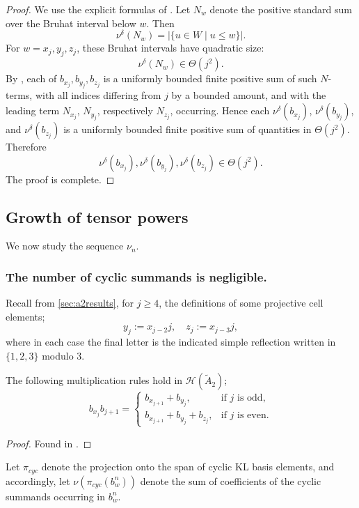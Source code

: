 \documentclass[a4paper,11pt]{amsart}
\newcommand{\Hecke}{\mc H}
\newcommand{\mc}{\mathcal}
\numberwithin{equation}{subsection}
\theoremstyle{definition}
\theoremstyle{remark}
\begin{document}
\begin{proof}
We use the explicit formulas of 
\cite[Lemma~1.4 and Proposition~1.6]{LiPa}. Let \(N_w\) denote the positive
standard sum over the Bruhat interval below \(w\). Then
\[
\nu^\delta(N_w)=|\{u\in W\mid u\leq w\}|.
\]
For \(w=x_j,y_j,z_j\), these Bruhat intervals have quadratic size:
\[
\nu^\delta(N_w)\in\Theta(j^2).
\]
By \cite[Proposition~1.6]{LiPa}, each of
$b_{x_j},b_{y_j},b_{z_j}$
is a uniformly bounded finite positive sum of such \(N\)-terms, with all indices differing from
\(j\) by a bounded amount, and with the leading term \(N_{x_j}\), \(N_{y_j}\),
respectively \(N_{z_j}\), occurring. Hence each
\(\nu^\delta(b_{x_j})\), \(\nu^\delta(b_{y_j})\), and
\(\nu^\delta(b_{z_j})\) is a uniformly bounded finite positive sum of quantities in
\(\Theta(j^2)\). Therefore
\[
\nu^\delta(b_{x_j}), \nu^\delta(b_{y_j}), \nu^\delta(b_{z_j}) \in\Theta(j^2).
\]
The proof is complete.
\end{proof}

\subsection{Growth of tensor powers}

We now study the sequence $\nu_n$.

\subsubsection{The number of cyclic summands is negligible.}\label{sec:cyclic}
Recall from \autoref{sec:a2results}, for $j \geq 4$, the definitions of some projective cell elements;
\[
y_j:=x_{j-2}j,
\quad
z_j:=x_{j-3}j,
\]
where in each case the final letter is the indicated simple reflection written in $\{1,2,3\}$ modulo $3$.

\begin{Lemma}\label{lem:cyclic-mult}
The following multiplication rules hold in $\Hecke({\widetilde A_2})$;
\[
b_{x_j}b_{j+1}=
\begin{cases}
b_{x_{j+1}}+b_{y_j},&\text{if }j\text{ is odd},\\[0.4em]
b_{x_{j+1}}+b_{y_j}+b_{z_j},&\text{if }j\text{ is even}.
\end{cases}
\]
\end{Lemma}

\begin{proof}
Found in \cite{LiPa}.
\end{proof}

Let $\pi_{cyc}$ denote the projection onto the span of cyclic KL basis elements, and accordingly, let $\nu(\pi_{cyc}(b_w^n))$
denote the sum of coefficients of the cyclic summands occurring in $b_w^n$.
\end{document}
